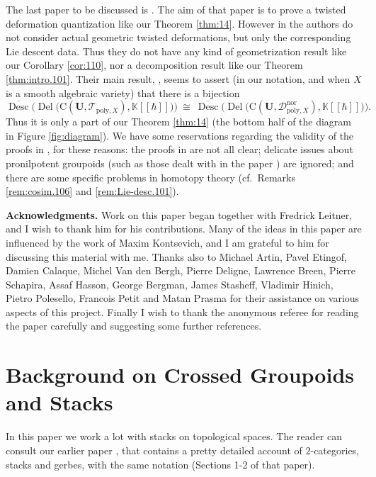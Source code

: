 \documentclass[a4paper, 10pt]{amsart}
\theoremstyle{definition}
\numberwithin{equation}{section}
\newcommand{\opn}{\operatorname}
\newcommand{\ol}{\overline}
\newcommand{\mcal}[1]{\mathcal{#1}}
\newcommand{\mrm}[1]{\mathrm{#1}}
\newcommand{\mbb}[1]{\mathbb{#1}}
\newcommand{\bsym}[1]{\boldsymbol{#1}}
\newcommand{\K}{\mbb{K}}
\begin{document}
The last paper to be discussed is \cite{CH}. The aim of that paper is
to prove a twisted deformation quantization like our Theorem \ref{thm:14}.
However in \cite{CH} the authors do not consider actual geometric twisted
deformations, but only the corresponding Lie descent
data. Thus they do not have any kind of geometrization result like our Corollary
\ref{cor:110}, nor a decomposition result like our Theorem 
\ref{thm:intro.101}. Their main result, \cite[Theorem 3.5]{CH}, 
seems to assert (in our notation, and when $X$ is a
smooth algebraic variety) that there is a bijection
\[ \ol{\opn{Desc}} \bigl( \opn{Del} \bigl(
\mrm{C}(\bsym{U}, \mcal{T}_{\mrm{poly}, X}) , \K[[\hbar]] 
\bigr) \bigr)
\ \cong \
\ol{\opn{Desc}} \bigl( \opn{Del} \bigl(
\mrm{C}(\bsym{U}, \mcal{D}_{\mrm{poly}, X}^{\mrm{nor}}) , \K[[\hbar]]  
\bigr) \bigr) . \]
Thus it is only a part of our Theorem \ref{thm:14} (the bottom half of the
diagram in Figure \ref{fig:diagram}).
We have some reservations regarding the validity of the proofs in \cite{CH},
for these reasons: 
the proofs in \cite{CH} are not all clear; delicate issues about pronilpotent
groupoids (such as those dealt with in the paper \cite{Ye7}) are ignored; and
there are some specific problems in homotopy theory (cf.\ Remarks
\ref{rem:cosim.106} and \ref{rem:Lie-desc.101}).

 


\medskip \noindent
\textbf{Acknowledgments.}
Work on this paper began together with Fredrick Leitner, and I wish to
thank him for his contributions. Many of the ideas in this paper are influenced
by the work of Maxim Kontsevich, and I am grateful to him for discussing this
material with me. Thanks also to Michael Artin, Pavel Etingof, Damien
Calaque, Michel Van den Bergh, Pierre Deligne, Lawrence Breen, Pierre Schapira,
Assaf Hasson, George Bergman, James Stasheff, Vladimir Hinich, Pietro
Polesello, Francois Petit and Matan Prasma for their assistance on various
aspects of this project. 
Finally I wish to thank the anonymous referee for reading the paper carefully 
and suggesting some further references. 




\section{Background on Crossed Groupoids and Stacks}
\label{sec:back}

In this paper we work a lot with stacks on topological spaces. The reader can
consult our earlier paper \cite{Ye4}, that contains a pretty detailed account
of $2$-categories, stacks and gerbes, with the same notation (Sections 1-2 of
that paper). 
\end{document}
